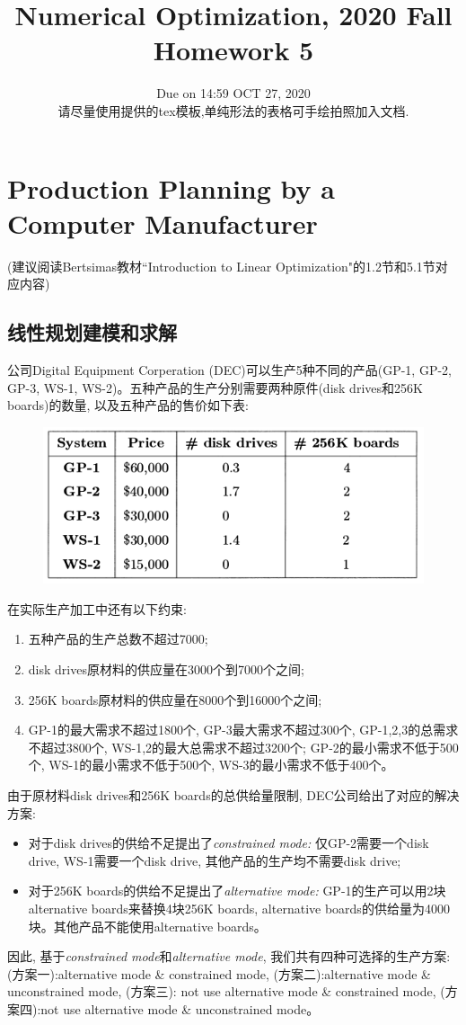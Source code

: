 \documentclass[10pt]{article}
\begin{document}
	
\title{	Numerical Optimization, 2020 Fall\\Homework 5}
\date{Due on 14:59 OCT 27, 2020\\
	请尽量使用提供的tex模板,单纯形法的表格可手绘拍照加入文档.
	}
\maketitle

\section*{Production Planning by a Computer Manufacturer}
{\color{red}(建议阅读Bertsimas教材``Introduction to Linear Optimization"的1.2节和5.1节对应内容)}
\subsection*{线性规划建模和求解}
公司Digital Equipment Corperation (DEC)可以生产5种不同的产品(GP-1, GP-2, GP-3, WS-1, WS-2)。五种产品的生产分别需要两种原件(disk drives和256K boards)的数量, 以及五种产品的售价如下表:
\begin{figure}[H]
	\centering
	\includegraphics[width=0.55\linewidth]{HW5_1.png}
	\label{fig.prob1}
\end{figure}
\noindent
在实际生产加工中还有以下约束:
\begin{enumerate}
	\item 五种产品的生产总数不超过7000;
	\item disk drives原材料的供应量在3000个到7000个之间;
	\item 256K boards原材料的供应量在8000个到16000个之间;
	\item GP-1的最大需求不超过1800个, GP-3最大需求不超过300个, GP-1,2,3的总需求不超过3800个, WS-1,2的最大总需求不超过3200个; GP-2的最小需求不低于500个, WS-1的最小需求不低于500个, WS-3的最小需求不低于400个。
\end{enumerate}
由于原材料disk drives和256K boards的总供给量限制, DEC公司给出了对应的解决方案:
\begin{itemize}
	\item 对于disk drives的供给不足提出了\emph{constrained mode:} 仅GP-2需要一个disk drive, WS-1需要一个disk drive, 其他产品的生产均不需要disk drive;
	\item 对于256K boards的供给不足提出了\emph{alternative mode:} GP-1的生产可以用2块alternative boards来替换4块256K boards, alternative boards的供给量为4000块。其他产品不能使用alternative boards。
\end{itemize}
因此, 基于\emph{constrained mode}和\emph{alternative mode}, 我们共有四种可选择的生产方案: 
(方案一):{alternative mode} \& {constrained mode}, (方案二):{alternative mode} \& {unconstrained mode}, (方案三): not use {alternative mode} \& {constrained mode}, (方案四):not use {alternative mode} \& {unconstrained mode}。
\end{document}
